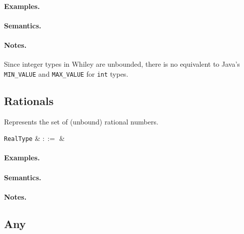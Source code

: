 \paragraph{Examples.}

\paragraph{Semantics.}

\paragraph{Notes.}  Since integer types in Whiley are unbounded, there
is no equivalent to Java's \lstinline{MIN_VALUE} and \lstinline{MAX_VALUE} for \lstinline{int} types.


\subsection{Rationals}

Represents the set of (unbound) rational numbers.

\begin{syntax}
  \verb+RealType+ & $::=$ &  \\
\end{syntax}

\paragraph{Examples.}

\paragraph{Semantics.}

\paragraph{Notes.} 


\subsection{Any}

